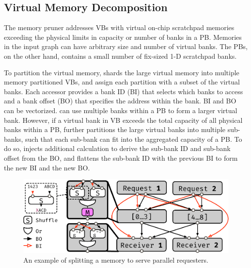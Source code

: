 \subsection{Virtual Memory Decomposition} \label{sec:memsplit}
The memory pruner addresses VBs with virtual on-chip scratchpad memories exceeding the physical limits in capacity or number of banks in a PB.
Memories in the input graph can have arbitrary size and number of virtual banks.
The PBs, on the other hand, contains a small number of fix-sized 1-D scratchpad banks.

To partition the virtual memory, \name{} shards the large virtual memory into multiple memory partitioned VBs, and assign each partition with a subset of the virtual banks.
Each accessor provides a bank ID (BI) that selects which banks to access and a bank offset (BO) that specifies the address within the bank. 
BI and BO can be vectorized.
\name{} can use multiple banks within a PB to form a larger virtual bank.
However, if a virtual bank in VB exceeds the total capacity of all physical banks within a PB, \name{} further partitions the large virtual banks into multiple sub-banks, such that each sub-bank can fit into the aggregated capacity of a PB.
To do so, \name{} injects additional calculation to derive the sub-bank ID and sub-bank offset from the BO, and flattens the sub-bank ID with the previous BI to form the new BI and the new BO.


\begin{figure}
  \centering
  \includegraphics[width=1\columnwidth]{figs/memsplit.pdf}
  \caption{An example of splitting a memory to serve parallel requesters.}
  \label{fig:memsplit}
\end{figure}

